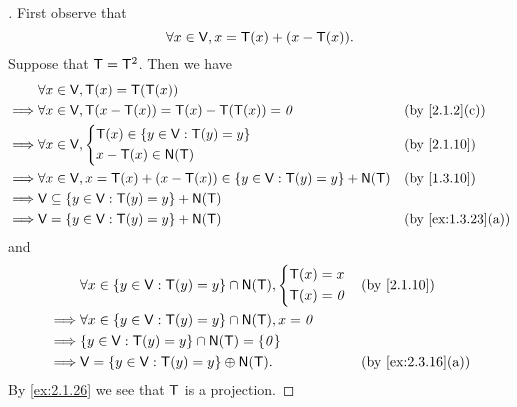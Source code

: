 \begin{proof}[]
  First observe that
  \[
    \forall x \in \mathsf{V}, x = \mathsf{T}(x) + (x - \mathsf{T}(x)).
  \]
  Suppose that \(\mathsf{T} = \mathsf{T}^2\).
  Then we have
  \begin{align*}
             & \forall x \in \V, \T(x) = \T(\T(x))                                                                       \\
    \implies & \forall x \in \V, \T(x - \T(x)) = \T(x) - \T(\T(x)) = \zv                          &  & \by{2.1.2}[c]     \\
    \implies & \forall x \in \V, \begin{dcases}
                                   \T(x) \in \set{y \in \V : \T(y) = y} \\
                                   x - \T(x) \in \ns{\T}
                                 \end{dcases}                                            &  & \by{2.1.10}                \\
    \implies & \forall x \in \V, x = \T(x) + (x - \T(x)) \in \set{y \in \V : \T(y) = y} + \ns{\T} &  & \by{1.3.10}       \\
    \implies & \V \subseteq \set{y \in \V : \T(y) = y} + \ns{\T}                                                         \\
    \implies & \V = \set{y \in \V : \T(y) = y} + \ns{\T}                                          &  & \by{ex:1.3.23}[a]
  \end{align*}
  and
  \begin{align*}
             & \forall x \in \set{y \in \V : \T(y) = y} \cap \ns{\T}, \begin{dcases}
                                                                        \T(x) = x \\
                                                                        \T(x) = \zv
                                                                      \end{dcases} &  & \by{2.1.10}         \\
    \implies & \forall x \in \set{y \in \V : \T(y) = y} \cap \ns{\T}, x = \zv                               \\
    \implies & \set{y \in \V : \T(y) = y} \cap \ns{\T} = \set{\zv}                                          \\
    \implies & \V = \set{y \in \V : \T(y) = y} \oplus \ns{\T}.                       &  & \by{ex:2.3.16}[a]
  \end{align*}
  By \cref{ex:2.1.26} we see that \(\mathsf{T}\) is a projection.
\end{proof}

